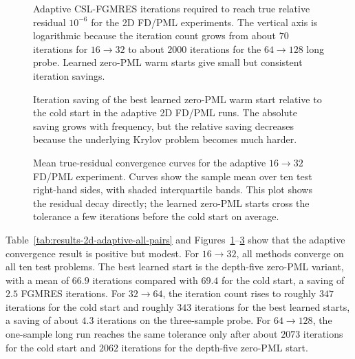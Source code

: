 \begin{figure}[htbp]
    \centering
    \caption{Adaptive CSL-FGMRES iterations required to reach true relative
    residual $10^{-6}$ for the 2D FD/PML experiments. The vertical axis is
    logarithmic because the iteration count grows from about $70$ iterations
    for $16\to32$ to about $2000$ iterations for the $64\to128$ long probe.
    Learned zero-PML warm starts give small but consistent iteration savings.}
    \label{fig:results-2d-adaptive-iters-all-pairs}
\end{figure}

\begin{figure}[htbp]
    \centering
    \caption{Iteration saving of the best learned zero-PML warm start relative
    to the cold start in the adaptive 2D FD/PML runs. The absolute saving grows
    with frequency, but the relative saving decreases because the underlying
    Krylov problem becomes much harder.}
    \label{fig:results-2d-adaptive-savings}
\end{figure}

\begin{figure}[htbp]
    \centering
    \caption{Mean true-residual convergence curves for the adaptive
    $16\to32$ FD/PML experiment. Curves show the sample mean over ten test
    right-hand sides, with shaded interquartile bands. This plot shows the
    residual decay directly; the learned zero-PML starts cross the tolerance
    a few iterations before the cold start on average.}
    \label{fig:results-2d-adaptive-16-32-curves}
\end{figure}

Table~\ref{tab:results-2d-adaptive-all-pairs} and
Figures~\ref{fig:results-2d-adaptive-iters-all-pairs}--\ref{fig:results-2d-adaptive-16-32-curves}
show that the adaptive convergence result is positive but modest. For
$16\to32$, all methods converge on all ten test problems. The best learned
start is the depth-five zero-PML variant, with a mean of $66.9$ iterations
compared with $69.4$ for the cold start, a saving of $2.5$ FGMRES iterations.
For $32\to64$, the iteration count rises to roughly $347$ iterations for the
cold start and roughly $343$ iterations for the best learned starts, a saving
of about $4.3$ iterations on the three-sample probe. For $64\to128$, the
one-sample long run reaches the same tolerance only after about $2073$
iterations for the cold start and $2062$ iterations for the depth-five
zero-PML start.

